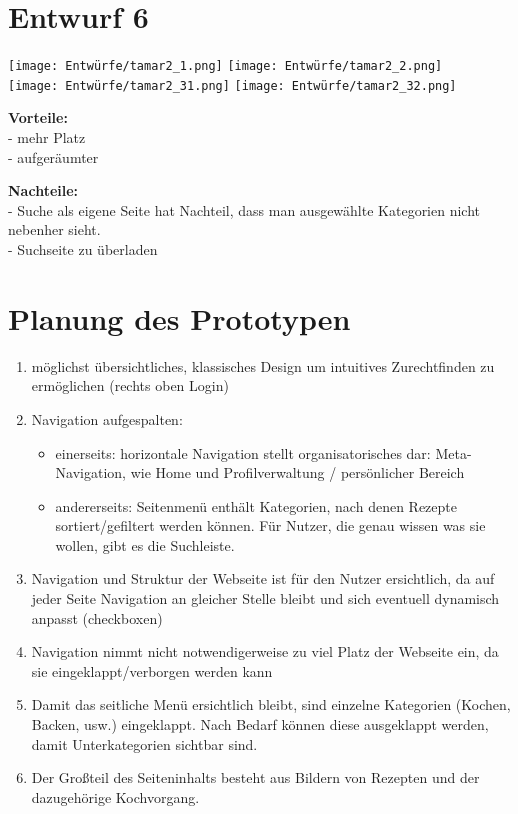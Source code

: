 \documentclass[parskip,10pt,abstracton]{scrartcl}
\begin{document}
\section*{Entwurf 6} %

\texttt{[image: Entwürfe/tamar2\_1.png]}
\texttt{[image: Entwürfe/tamar2\_2.png]}\\
\texttt{[image: Entwürfe/tamar2\_31.png]}
\texttt{[image: Entwürfe/tamar2\_32.png]}


\textbf{Vorteile:} \\
- mehr Platz\\
- aufgeräumter

\textbf{Nachteile:}\\
- Suche als eigene Seite hat Nachteil, dass man ausgewählte Kategorien nicht nebenher sieht.\\
- Suchseite zu überladen


\pagebreak
\section*{Planung des Prototypen}

\begin{enumerate}
 \item möglichst übersichtliches, klassisches Design um intuitives Zurechtfinden zu ermöglichen (rechts oben Login)
 \item Navigation aufgespalten:
 \begin{itemize}
  \item einerseits: horizontale Navigation stellt organisatorisches dar: Meta-Navigation, wie Home und Profilverwaltung / persönlicher Bereich
  \item andererseits: Seitenmenü enthält Kategorien, nach denen Rezepte sortiert/gefiltert werden können. Für Nutzer, die genau wissen was sie wollen, gibt es die Suchleiste.
 \end{itemize}
 \item Navigation und Struktur der Webseite ist für den Nutzer ersichtlich, da auf jeder Seite Navigation an gleicher Stelle bleibt und sich eventuell dynamisch anpasst (checkboxen)
 \item Navigation nimmt nicht notwendigerweise zu viel Platz der Webseite ein, da sie eingeklappt/verborgen werden kann
 \item Damit das seitliche Menü ersichtlich bleibt, sind einzelne Kategorien (Kochen, Backen, usw.) eingeklappt. Nach Bedarf können diese ausgeklappt werden, damit Unterkategorien sichtbar sind. 
 \item Der Großteil des Seiteninhalts besteht aus Bildern von Rezepten und der dazugehörige Kochvorgang.

\end{enumerate}
\end{document}
